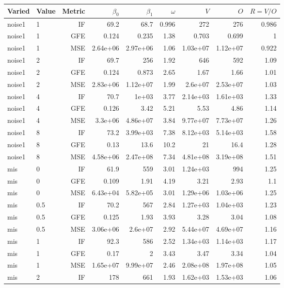 \begin{table}[t]
\centering
\small
\begin{tabular}{llrrrrrrr}
\toprule
Varied & Value & Metric & $\beta_0$ & $\beta_1$ & $\omega$ & $V$ & $O$ & $R=V/O$ \\
\midrule
noise1 & 1 & IF & 69.2 & 68.7 & 0.996 & 272 & 276 & 0.986 \\
noise1 & 1 & GFE & 0.124 & 0.235 & 1.38 & 0.703 & 0.699 & 1 \\
noise1 & 1 & MSE & 2.64e+06 & 2.97e+06 & 1.06 & 1.03e+07 & 1.12e+07 & 0.922 \\
noise1 & 2 & IF & 69.7 & 256 & 1.92 & 646 & 592 & 1.09 \\
noise1 & 2 & GFE & 0.124 & 0.873 & 2.65 & 1.67 & 1.66 & 1.01 \\
noise1 & 2 & MSE & 2.83e+06 & 1.12e+07 & 1.99 & 2.6e+07 & 2.53e+07 & 1.03 \\
noise1 & 4 & IF & 70.7 & 1e+03 & 3.77 & 2.14e+03 & 1.61e+03 & 1.33 \\
noise1 & 4 & GFE & 0.126 & 3.42 & 5.21 & 5.53 & 4.86 & 1.14 \\
noise1 & 4 & MSE & 3.3e+06 & 4.86e+07 & 3.84 & 9.77e+07 & 7.73e+07 & 1.26 \\
noise1 & 8 & IF & 73.2 & 3.99e+03 & 7.38 & 8.12e+03 & 5.14e+03 & 1.58 \\
noise1 & 8 & GFE & 0.13 & 13.6 & 10.2 & 21 & 16.4 & 1.28 \\
noise1 & 8 & MSE & 4.58e+06 & 2.47e+08 & 7.34 & 4.81e+08 & 3.19e+08 & 1.51 \\
\midrule
mis & 0 & IF & 61.9 & 559 & 3.01 & 1.24e+03 & 994 & 1.25 \\
mis & 0 & GFE & 0.109 & 1.91 & 4.19 & 3.21 & 2.93 & 1.1 \\
mis & 0 & MSE & 6.43e+04 & 5.82e+05 & 3.01 & 1.29e+06 & 1.03e+06 & 1.25 \\
mis & 0.5 & IF & 70.2 & 567 & 2.84 & 1.27e+03 & 1.04e+03 & 1.23 \\
mis & 0.5 & GFE & 0.125 & 1.93 & 3.93 & 3.28 & 3.04 & 1.08 \\
mis & 0.5 & MSE & 3.06e+06 & 2.6e+07 & 2.92 & 5.44e+07 & 4.69e+07 & 1.16 \\
mis & 1 & IF & 92.3 & 586 & 2.52 & 1.34e+03 & 1.14e+03 & 1.17 \\
mis & 1 & GFE & 0.17 & 2 & 3.43 & 3.47 & 3.34 & 1.04 \\
mis & 1 & MSE & 1.65e+07 & 9.99e+07 & 2.46 & 2.08e+08 & 1.97e+08 & 1.05 \\
mis & 2 & IF & 178 & 661 & 1.93 & 1.62e+03 & 1.53e+03 & 1.06 \\

\end{tabular}
\end{table}
